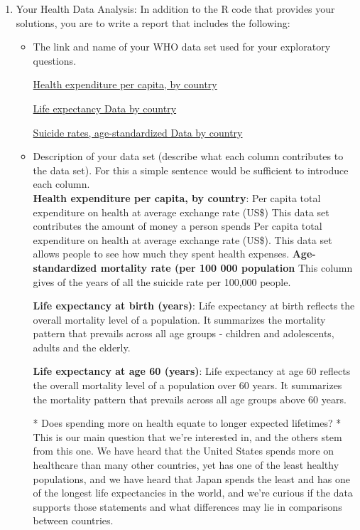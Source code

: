\documentclass[11pt]{article}
\begin{document}
\begin{enumerate}



\item Your Health Data Analysis: In addition to the R code that provides your solutions, you
are to write a report that includes the following:

\begin{itemize}
\item The link and name of your WHO data set used for your exploratory questions.

\href{http://apps.who.int/gho/data/node.main.78?lang=en}{Health expenditure per capita, by country}

\href{http://apps.who.int/gho/data/view.main.SDG2016LEXv?lang=en}{Life expectancy
Data by country} 

\href{http://apps.who.int/gho/data/node.main.MHSUICIDEASDR?lang=en}{Suicide rates, age-standardized
Data by country} 

\item  Description of your data set (describe what each column contributes to the data set).
For this a simple sentence would be sufficient to introduce each column.\\
\textbf {Health expenditure per capita, by country}: Per capita total expenditure on health at average exchange rate (US\$)
This data set contributes the amount of money a person spends Per capita total expenditure on health at average exchange rate (US\$). This data set allows people to see how much they spent health expenses. 
\textbf{Age-standardized mortality rate (per 100 000 population}
This column gives of the years of all the suicide rate per 100,000 people. 

\textbf{Life expectancy at birth (years)}:
Life expectancy at birth reflects the overall mortality level of a population. It summarizes the mortality pattern that prevails across all age groups - children and adolescents, adults and the elderly.

\textbf{Life expectancy at age 60 (years)}:
Life expectancy at age 60 reflects the overall mortality level of a population over 60 years. It summarizes the mortality pattern that prevails across all age groups above 60 years.





* Does spending more on health equate to longer expected lifetimes?
  * This is our main question that we're interested in, and the others stem from
    this one.  We have heard that the United States spends more on healthcare
    than many other countries, yet has one of the least healthy populations, and
    we have heard that Japan spends the least and has one of the longest life
    expectancies in the world, and we're curious if the data supports those
    statements and what differences may lie in comparisons between countries.


\end{itemize}
\end{enumerate}
\end{document}

